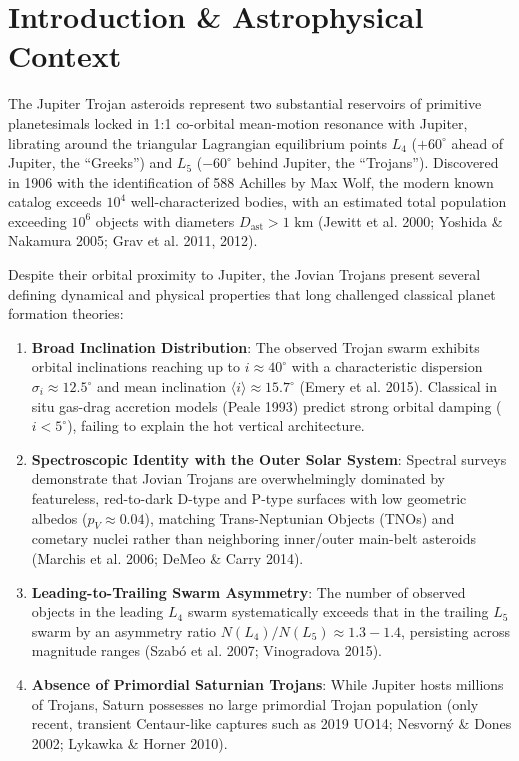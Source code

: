 \documentclass[11pt,a4paper]{article}
\begin{document}
\section{Introduction \& Astrophysical Context}
The Jupiter Trojan asteroids represent two substantial reservoirs of primitive planetesimals locked in 1:1 co-orbital mean-motion resonance with Jupiter, librating around the triangular Lagrangian equilibrium points $L_4$ ($+60^\circ$ ahead of Jupiter, the ``Greeks'') and $L_5$ ($-60^\circ$ behind Jupiter, the ``Trojans''). Discovered in 1906 with the identification of 588 Achilles by Max Wolf, the modern known catalog exceeds $10^4$ well-characterized bodies, with an estimated total population exceeding $10^6$ objects with diameters $D_{\text{ast}} > 1\text{ km}$ (Jewitt et al. 2000; Yoshida \& Nakamura 2005; Grav et al. 2011, 2012).

Despite their orbital proximity to Jupiter, the Jovian Trojans present several defining dynamical and physical properties that long challenged classical planet formation theories:
\begin{enumerate}
    \item \textbf{Broad Inclination Distribution}: The observed Trojan swarm exhibits orbital inclinations reaching up to $i \approx 40^\circ$ with a characteristic dispersion $\sigma_i \approx 12.5^\circ$ and mean inclination $\langle i \rangle \approx 15.7^\circ$ (Emery et al. 2015). Classical in situ gas-drag accretion models (Peale 1993) predict strong orbital damping ($i < 5^\circ$), failing to explain the hot vertical architecture.
    \item \textbf{Spectroscopic Identity with the Outer Solar System}: Spectral surveys demonstrate that Jovian Trojans are overwhelmingly dominated by featureless, red-to-dark D-type and P-type surfaces with low geometric albedos ($p_V \approx 0.04$), matching Trans-Neptunian Objects (TNOs) and cometary nuclei rather than neighboring inner/outer main-belt asteroids (Marchis et al. 2006; DeMeo \& Carry 2014).
    \item \textbf{Leading-to-Trailing Swarm Asymmetry}: The number of observed objects in the leading $L_4$ swarm systematically exceeds that in the trailing $L_5$ swarm by an asymmetry ratio $N(L_4)/N(L_5) \approx 1.3 - 1.4$, persisting across magnitude ranges (Szab{\'o} et al. 2007; Vinogradova 2015).
    \item \textbf{Absence of Primordial Saturnian Trojans}: While Jupiter hosts millions of Trojans, Saturn possesses no large primordial Trojan population (only recent, transient Centaur-like captures such as 2019 UO14; Nesvorn{\'y} \& Dones 2002; Lykawka \& Horner 2010).
\end{enumerate}
\end{document}
